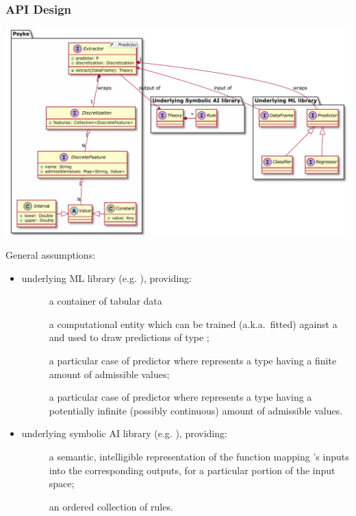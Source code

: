 \documentclass[presentation]{beamer}\mode<presentation>{\usetheme{AMSBolognaFC}}
\begin{document}
\begin{frame}[allowframebreaks]
\frametitle{API Design}

    \begin{center}
        \includegraphics[width=.9\linewidth]{figures/extractor-api.pdf}
    \end{center}

    \framebreak

    General assumptions:
    \begin{itemize}
        \item underlying ML library (e.g. \scikit{}), providing:
        \begin{description}
            \item[] a container of tabular data
            \item[] a computational entity which can be trained (a.k.a.\ fitted) against a  and used to draw predictions of type ;
            \item[] a particular case of predictor where  represents a type having a finite amount of admissible values;
            \item[] a particular case of predictor where  represents a type having a potentially infinite (possibly continuous) amount of admissible values.
        \end{description}

        \framebreak

        \item underlying symbolic AI library (e.g. \twopkt{}), providing:
        \begin{description}
            \item[] a semantic, intelligible representation of the function mapping 's inputs into the corresponding outputs, for a particular portion of the input space;
            \item[] an ordered collection of rules.
        \end{description}
    \end{itemize}
\end{frame}
\end{document}
